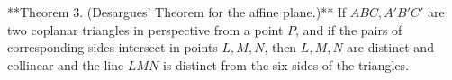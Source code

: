 **Theorem 3. (Desargues' Theorem for the affine plane.)** If $ABC, A'B'C'$ are two coplanar triangles in perspective from a point $P$, and if the pairs of corresponding sides intersect in points $L, M, N$, then $L, M, N$ are distinct and collinear and the line $LMN$ is distinct from the six sides of the triangles.
